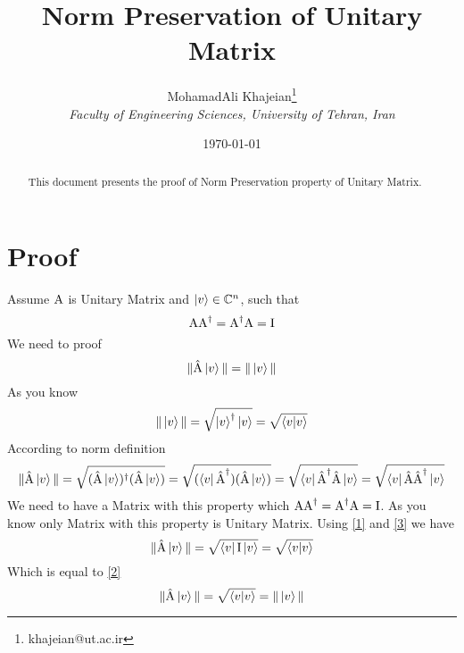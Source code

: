 \documentclass[12pt]{article}
\title{\textbf{Norm Preservation of Unitary Matrix}}
\author{
    MohamadAli Khajeian\footnote{khajeian@ut.ac.ir} \\ 
    \small \textit{Faculty of Engineering Sciences, University of Tehran, Iran} \\ 
}
\date{\today}
\begin{document}
\maketitle

\begin{abstract}
    This document presents the proof of Norm Preservation property of Unitary Matrix.
\end{abstract}

\section*{Proof}

Assume $\textnormal{A}$ is Unitary Matrix and $\ket{v} \in \mathbb{C}^{n}$, such that
\begin{equation}
    \label{1}
    \textnormal{A}\textnormal{A}^{\dagger} = \textnormal{A}^{\dagger}\textnormal{A} = \textnormal{I}
\end{equation}
We need to proof
\begin{equation*}
    \|\hat{\textnormal{A}}\ket{v}\| = \|\ket{v}\|
\end{equation*}
As you know
\begin{equation}
    \label{2}
    \|\ket{v}\| = \sqrt{\ket{v}^{\dagger}\ket{v}} = \sqrt{\braket{v|v}}
\end{equation}
According to norm definition
\begin{equation}
    \label{3}
    \|\hat{\textnormal{A}}\ket{v}\| = \sqrt{(\hat{\textnormal{A}}\ket{v})^{\dagger}(\hat{\textnormal{A}}\ket{v})}
    = \sqrt{(\bra{v}\hat{\textnormal{A}}^{\dagger})(\hat{\textnormal{A}}\ket{v})}
    = \sqrt{\bra{v}\hat{\textnormal{A}}^{\dagger}\hat{\textnormal{A}}\ket{v}}
    = \sqrt{\bra{v}\hat{\textnormal{A}}\hat{\textnormal{A}}^{\dagger}\ket{v}}
\end{equation}
We need to have a Matrix with this property which $\textnormal{A}\textnormal{A}^{\dagger} = \textnormal{A}^{\dagger}\textnormal{A} = \textnormal{I}$. As you know only Matrix with this property is Unitary Matrix. Using \ref{1} and \ref{3} we have
\begin{equation}
    \|\hat{\textnormal{A}}\ket{v}\| = \sqrt{\bra{v}\textnormal{I}\ket{v}} = \sqrt{\braket{v|v}}
\end{equation}
Which is equal to \ref{2}
\begin{equation}
    \|\hat{\textnormal{A}}\ket{v}\| = \sqrt{\braket{v|v}} = \|\ket{v}\|
\end{equation}
\end{document}
